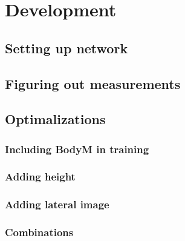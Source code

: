 \chapter{Development}
\section{Setting up network}
\section{Figuring out measurements}
\section{Optimalizations}
\subsection{Including BodyM in training}
\subsection{Adding height}
\subsection{Adding lateral image}
\subsection{Combinations}

